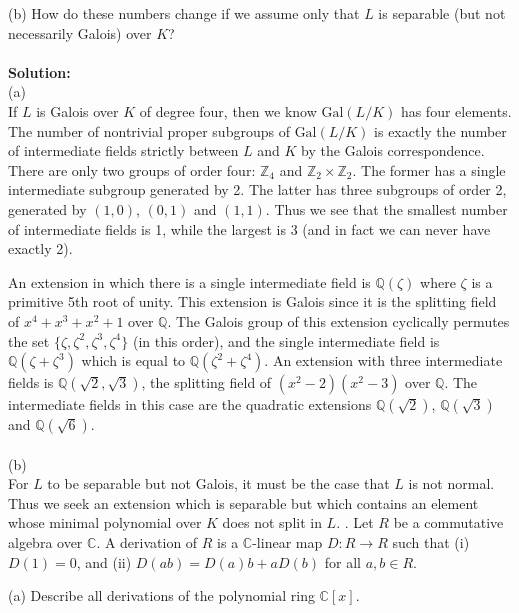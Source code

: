 \documentclass[11pt]{article}
\newcommand{\Z}{\mathbb{Z}}
\newcommand{\Q}{\mathbb{Q}}
\newcommand{\C}{\mathbb{C}}
\begin{document}
(b) How do these numbers change if we assume only that $L$ is separable (but not
necessarily Galois) over $K$?\\\\
\textbf{Solution:}\\
(a)\\
If $L$ is Galois over $K$ of degree four, then we know $\mbox{Gal}(L/K)$ has four elements. The number of nontrivial proper subgroups of $\mbox{Gal}(L/K)$ is exactly the number of intermediate fields strictly between $L$ and $K$ by the Galois correspondence. There are only two groups of order four: $\Z_4$ and $\Z_2\times \Z_2$. The former has a single intermediate subgroup generated by 2. The latter has three subgroups of order 2, generated by $(1,0)$, $(0,1)$ and $(1,1)$. Thus we see that the smallest number of intermediate fields is 1, while the largest is 3 (and in fact we can never have exactly 2). 

An extension in which there is a single intermediate field is $\Q(\zeta)$ where $\zeta$ is a primitive 5th root of unity. This extension is Galois since it is the splitting field of $x^4+x^3+x^2+1$ over  $\Q$. The Galois group of this extension cyclically permutes the set $\{\zeta, \zeta^2,\zeta^3,\zeta^4\}$ (in this order), and the single intermediate field is $\Q(\zeta+\zeta^3)$ which is equal to $\Q(\zeta^2+\zeta^4)$. An extension with three intermediate fields is $\Q(\sqrt{2},\sqrt{3})$, the splitting field of $(x^2-2)(x^2-3)$ over $\Q$. The intermediate fields in this case are the quadratic extensions $\Q(\sqrt{2})$, $\Q(\sqrt{3})$ and $\Q(\sqrt{6})$.\\\\
(b)\\
For $L$ to be separable but not Galois, it must be the case that $L$ is not normal. Thus we seek an extension which is separable but which contains an element whose minimal polynomial over $K$ does not split in $L$. 
. Let $R$ be a commutative algebra over $\C$. A derivation of $R$ is a $\C$-linear map $D:R\to R$ such that (i) $D(1) = 0$, and (ii) $D(ab) = D(a)b + aD(b)$ for all $a,b\in R$.

(a) Describe all derivations of the polynomial ring $\C[x]$.
\end{document}
